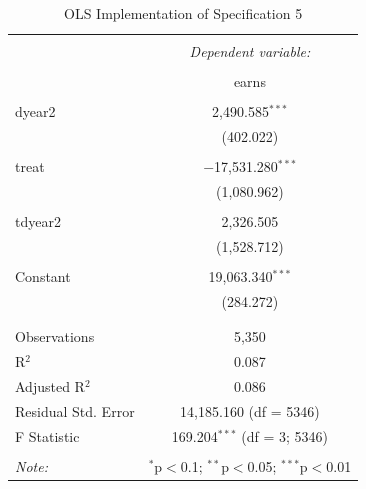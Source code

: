 \documentclass[
]{article}
\begin{document}
\newpage

\begin{table}[!htbp] \centering 
  \caption{OLS Implementation of Specification 5} 
  \label{item:lms5} 
\begin{tabular}{@{\extracolsep{5pt}}lc} 
\\[-1.8ex]\hline 
\hline \\[-1.8ex] 
 & \multicolumn{1}{c}{\textit{Dependent variable:}} \\ 
\cline{2-2} 
\\[-1.8ex] & earns \\ 
\hline \\[-1.8ex] 
 dyear2 & 2,490.585$^{***}$ \\ 
  & (402.022) \\ 
  & \\ 
 treat & $-$17,531.280$^{***}$ \\ 
  & (1,080.962) \\ 
  & \\ 
 tdyear2 & 2,326.505 \\ 
  & (1,528.712) \\ 
  & \\ 
 Constant & 19,063.340$^{***}$ \\ 
  & (284.272) \\ 
  & \\ 
\hline \\[-1.8ex] 
Observations & 5,350 \\ 
R$^{2}$ & 0.087 \\ 
Adjusted R$^{2}$ & 0.086 \\ 
Residual Std. Error & 14,185.160 (df = 5346) \\ 
F Statistic & 169.204$^{***}$ (df = 3; 5346) \\ 
\hline 
\hline \\[-1.8ex] 
\textit{Note:}  & \multicolumn{1}{r}{$^{*}$p$<$0.1; $^{**}$p$<$0.05; $^{***}$p$<$0.01} \\ 
\end{tabular} 
\end{table}
\end{document}
